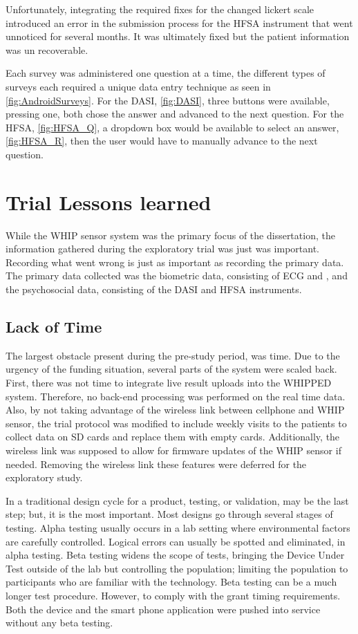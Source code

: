 Unfortunately, integrating the required fixes for the changed lickert scale introduced an error in the submission process for the HFSA instrument that went unnoticed for several months. It was ultimately fixed but the patient information was un recoverable.

Each survey was administered one question at a time, the different types of surveys each required a unique data entry technique as seen in \cref{fig:AndroidSurveys}. For the DASI, \cref{fig:DASI}, three buttons were available, pressing one, both chose the answer and advanced to the next question. For the HFSA, \cref{fig:HFSA_Q}, a dropdown box would be available to select an answer, \cref{fig:HFSA_R}, then the user would have to manually advance to the next question. 



\section{Trial Lessons learned}

While the WHIP sensor system was the primary focus of the dissertation, the information gathered during the exploratory trial was just was important. Recording what went wrong is just as important as recording the primary data. The primary data collected was the biometric data, consisting of ECG and , and the psychosocial data, consisting of the DASI and HFSA instruments. 

\subsection{Lack of Time}
The largest obstacle present during the pre-study period, was time. Due to the urgency of the funding situation, several parts of the system were scaled back.  First, there was not time to integrate live result uploads into the WHIPPED system. Therefore, no back-end processing was performed on the real time data. Also, by not taking advantage of the wireless link between cellphone and WHIP sensor, the trial protocol was modified to include weekly visits to the patients to collect data on SD cards and replace them with empty cards. Additionally, the wireless link was supposed to allow for firmware updates of the WHIP sensor if needed. Removing the wireless link these features were deferred for the exploratory study.

In a traditional design cycle for a product, testing, or validation, may be the last step; but, it is the most important. Most designs go through several stages of testing. Alpha testing usually occurs in a lab setting where environmental factors are carefully controlled. Logical errors can usually be spotted and eliminated, in alpha testing. Beta testing widens the scope of tests, bringing the Device Under Test outside of the lab but controlling the population; limiting the population to participants who are familiar with the technology. Beta testing can be a much longer test procedure. However, to comply with the grant timing requirements. Both the device and the smart phone application were pushed into service without any beta testing. 

